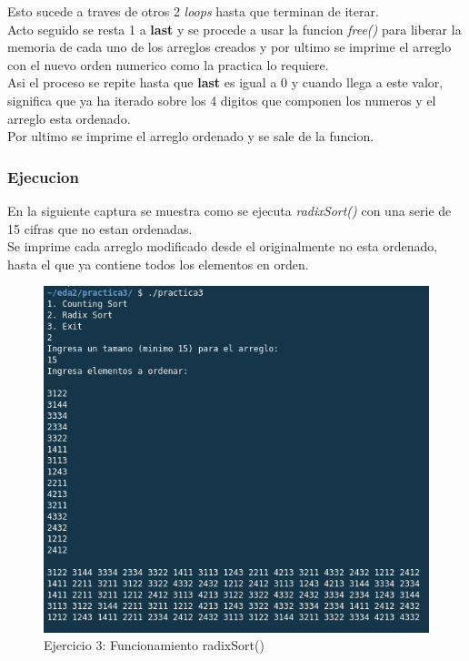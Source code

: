 \documentclass{article}
\begin{document}
				Esto sucede a traves de otros 2 \emph{loops} hasta que terminan de iterar.\\
				
				Acto seguido se resta 1 a \textbf{last} y se procede a usar la funcion \emph{free()} para liberar la memoria de cada uno de los arreglos creados y por ultimo se imprime el arreglo con el nuevo orden numerico como la practica lo requiere.\\
				
				Asi el proceso se repite hasta que \textbf{last} es igual a 0 y cuando llega a este valor, significa que ya ha iterado sobre los 4 digitos que componen los numeros y el arreglo esta ordenado.\\
				
				Por ultimo se imprime el arreglo ordenado y se sale de la funcion.
				
			\subsubsection{Ejecucion}
			
			En la siguiente captura se muestra como se ejecuta \emph{radixSort()} con una serie de 15 cifras que no estan ordenadas.\\
			
			Se imprime cada arreglo modificado desde el originalmente no esta ordenado, hasta el que ya contiene todos los elementos en orden.
			
			\begin{figure}[H]
				\centering
				\includegraphics[scale = 0.8]{images/e3.png}
				\caption*{Ejercicio 3: Funcionamiento radixSort()}
			\end{figure}
		
\end{document}
